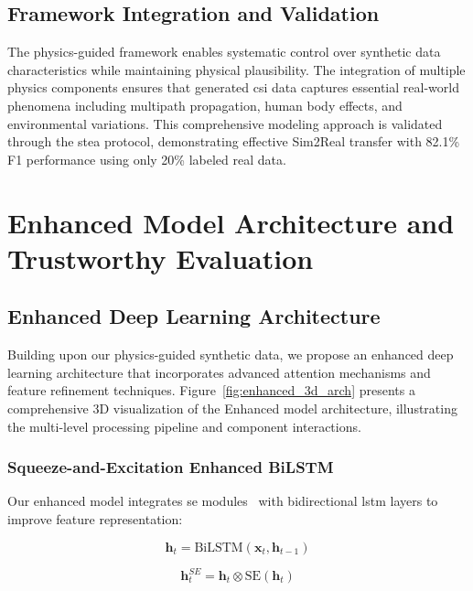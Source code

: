 \documentclass[journal]{IEEEtran}
\begin{document}
\subsection{Framework Integration and Validation}

The physics-guided framework enables systematic control over synthetic data characteristics while maintaining physical plausibility. The integration of multiple physics components ensures that generated \gls{csi} data captures essential real-world phenomena including multipath propagation, human body effects, and environmental variations. This comprehensive modeling approach is validated through the \gls{stea} protocol, demonstrating effective Sim2Real transfer with 82.1\% F1 performance using only 20\% labeled real data.

\section{Enhanced Model Architecture and Trustworthy Evaluation}

\subsection{Enhanced Deep Learning Architecture}

Building upon our physics-guided synthetic data, we propose an enhanced deep learning architecture that incorporates advanced attention mechanisms and feature refinement techniques. Figure~\ref{fig:enhanced_3d_arch} presents a comprehensive 3D visualization of the Enhanced model architecture, illustrating the multi-level processing pipeline and component interactions.

\subsubsection{Squeeze-and-Excitation Enhanced BiLSTM}

Our enhanced model integrates \gls{se} modules~\cite{se_networks2018} with bidirectional \gls{lstm} layers to improve feature representation:

\begin{equation}
\mathbf{h}_t = \text{BiLSTM}(\mathbf{x}_t, \mathbf{h}_{t-1})
\end{equation}

\begin{equation}
\mathbf{h}_t^{SE} = \mathbf{h}_t \otimes \text{SE}(\mathbf{h}_t)
\end{equation}
\end{document}
